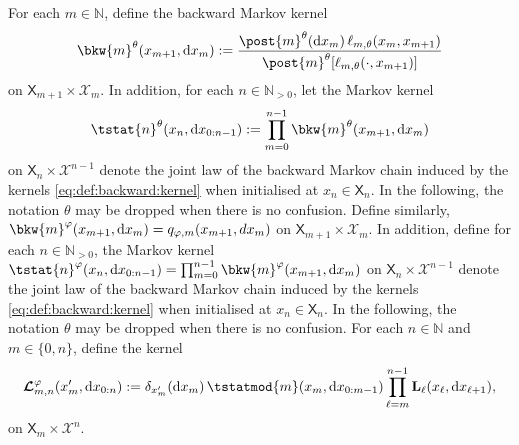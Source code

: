 \documentclass{article}
\newcommand{\Xfd}{\mathcal{X}}
\newcommand{\uksymbol}{\ell}
\newcommand{\precpar}{\varphi}
\newcommand{\intvect}[2]{\{ #1, #2 \}}
\newcommand{\ud}[1]{\uksymbol_{#1}}
\newcommand{\nset}{\mathbb{N}}
\newcommand{\nsetpos}{\mathbb{N}_{> 0}}
\newcommand{\1}{\mathbbm{1}}
\newcommand{\retrokmod}{\boldsymbol{\mathcal{L}}^\precpar}
\newcommand{\uk}[1]{\mathbf{L}_{#1}}
\newcommand{\tensprod}{\otimes}
\newcommand{\Xset}{\mathsf{X}}
\newcommand{\parvec}{\theta}
\newcommand{\bmf}[1]{\set{F}(#1)}
\newcommand{\set}[1]{\mathsf{#1}}
\newcommand{\hd}[1]{q_{#1}}
\newcommand{\rmd}{\ensuremath{\mathrm{d}}}
\newcommand{\eqdef}{\ensuremath{:=}}
\begin{document}
For each $m \in \nset$, define the  backward Markov kernel 
\begin{equation} \label{eq:def:backward:kernel}
    \bkw{m}^\parvec(x_{m + 1}, \rmd x_m) \eqdef \frac{\post{m}^\parvec(\rmd x_m) \, \ud{m,\parvec}(x_m, x_{m + 1})}{\post{m}^\parvec[\ud{m,\parvec}(\cdot, x_{m + 1})]} %
\end{equation}
on $\Xset_{m + 1} \times \Xfd_m$. In addition, for each $n \in \nsetpos$, let the Markov kernel   
\begin{equation} \label{eq:def:tstat}
\tstat{n}^\parvec(x_n, \rmd x_{0:n - 1}) \eqdef \prod_{m = 0}^{n - 1} \bkw{m}^\parvec(x_{m + 1}, \rmd x_m)
\end{equation}
on $\Xset_n \times \Xfd^{n - 1}$ denote the joint law of the backward Markov chain induced by the kernels \eqref{eq:def:backward:kernel} when initialised at $x_n \in \Xset_n$.   In the following, the notation $\parvec$ may be dropped when there is no confusion. Define similarly, $\bkw{m}^\varphi(x_{m + 1}, \rmd x_m) = q_{\varphi,m}(x_{m+1},dx_m)$
on $\Xset_{m + 1} \times \Xfd_m$. In addition, define for each $n \in \nsetpos$, the Markov kernel  $\tstat{n}^\varphi(x_n, \rmd x_{0:n - 1}) = \prod_{m = 0}^{n - 1} \bkw{m}^\varphi(x_{m + 1}, \rmd x_m)$ on $\Xset_n \times \Xfd^{n - 1}$ denote the joint law of the backward Markov chain induced by the kernels \eqref{eq:def:backward:kernel} when initialised at $x_n \in \Xset_n$.  In the following, the notation $\parvec$ may be dropped when there is no confusion. 
 For each $n \in \nset$ and $m \in \intvect{0}{n}$, define the kernel  
\begin{equation} \label{eq:def:retrokmod}
    \retrokmod_{m, n}(x_m', \rmd x_{0:n}) \eqdef \delta_{x_m'}(\rmd x_m) \, \tstatmod{m}(x_m, \rmd x_{0:m - 1}) \prod_{\ell = m}^{n - 1} \uk{\ell}(x_\ell, \rmd x_{\ell + 1}), 
\end{equation}
on $\Xset_m \times \Xfd^n$. 
\end{document}
